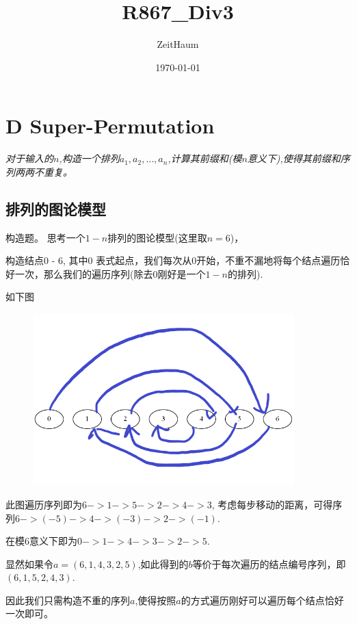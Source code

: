 \documentclass{article}
\author{ZeitHaum}
\date{\today}
\title{R867\_Div3}
\begin{document}
    \maketitle
    \newpage 
    \tableofcontents
    \newpage
    \setcounter{page}{1}
    \section{D Super-Permutation}
    \emph{对于输入的$n$,构造一个排列$a_1,a_2,...,a_n$,计算其前缀和(模$n$意义下),使得其前缀和序列两两不重复。}

    \subsection{排列的图论模型}
    构造题。
    思考一个$1 - n$排列的图论模型(这里取$n = 6$)，
    
    构造结点0 - 6, 其中0 表式起点，我们每次从0开始，不重不漏地将每个结点遍历恰好一次，那么我们的遍历序列(除去0刚好是一个$1 - n$的排列).
    
    如下图

    \begin{figure}[H]
        \centering
        \includegraphics[width = 0.9\textwidth]{fig1.png}
        \label{fig1}
    \end{figure}

    此图遍历序列即为$6->1->5->2->4->3$, 考虑每步移动的距离，可得序列$6->(-5)->4->(-3)->2->(-1)$.

    在模6意义下即为$0->1->4->3->2->5$.

    显然如果令$a = (6,1,4,3,2,5)$,如此得到的$b$等价于每次遍历的结点编号序列，即$(6 ,1 , 5 , 2 , 4 , 3)$.

    因此我们只需构造不重的序列$a$,使得按照$a$的方式遍历刚好可以遍历每个结点恰好一次即可。
\end{document}
